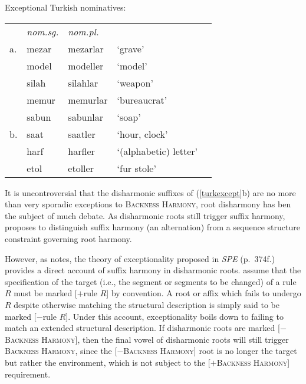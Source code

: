 \begin{example}
\label{turkexcept}
Exceptional Turkish nominatives:

\vspace{0.5\baselineskip}
\begin{tabular}{l l l l l}
   & \emph{nom.sg.} & \emph{nom.pl.} \\
a. & mezar          & mezarlar       & `grave' & \citep{TELL} \\
   & model          & modeller       & `model' \\
   & silah          & silahlar       & `weapon'     \\
   & memur          & memurlar       & `bureaucrat' \\
   & sabun          & sabunlar       & `soap'       \\
b. & saat           & saatler        & `hour, clock' \\
   & harf           & harfler        & `(alphabetic) letter' \\ %
   & etol           & etoller        & `fur stole' \\
\end{tabular}
\end{example}

It is uncontroversial that the disharmonic suffixes of (\ref{turkexcept}b) are no more than very sporadic exceptions to \textsc{Backness Harmony}, root disharmony has ben the subject of much debate.  As disharmonic roots still trigger suffix harmony, \citet[][212, 289]{Anderson1974} proposes to distinguish suffix harmony (an alternation) from a sequence structure constraint governing root harmony. 

However, as \citet[][?]{Zonneveld1978} notes, the theory of exceptionality proposed in \emph{SPE} (p.~374f.) provides a direct account of suffix harmony in disharmonic roots. \citeauthor{SPE} assume that the specification of the target (i.e., the segment or segments to be changed) of a rule $R$ must be marked [$+$rule $R$] by convention. A root or affix which fails to undergo $R$ despite otherwise matching the structural description is simply said to be marked [$-$rule $R$]. Under this account, exceptionality boils down to failing to match an extended structural description. If disharmonic roots are marked [$-$\textsc{Backness Harmony}], then the final vowel of disharmonic roots will still trigger \textsc{Backness Harmony}, since the [$-$\textsc{Backness Harmony}] root is no longer the target but rather the environment, which is not subject to the [$+$\textsc{Backness Harmony}] requirement.

